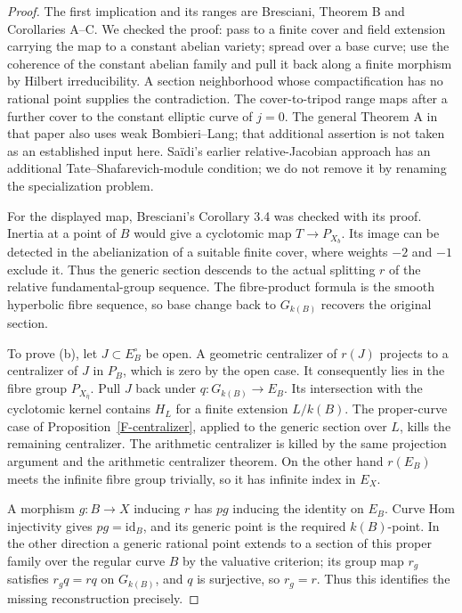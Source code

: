 \documentclass[11pt,oneside]{article}
\begin{document}
\begin{proof}
The first implication and its ranges are Bresciani, Theorem B
and Corollaries A--C\cite{F-BrescianiFiniteType}. We checked
the proof: pass to a finite cover and field extension carrying
the map to a constant abelian variety; spread over a base
curve; use the coherence of the constant abelian family and
pull it back along a finite morphism by Hilbert irreducibility.
A section neighborhood whose compactification has no rational
point supplies the contradiction. The cover-to-tripod range
maps after a further cover to the constant elliptic curve of
$j=0$. The general Theorem A in that paper also uses weak
Bombieri--Lang; that additional assertion is not taken as an
established input here. Sa\"idi's earlier relative-Jacobian
approach has an additional Tate--Shafarevich-module condition;
we do not remove it by renaming the specialization problem.

For the displayed map, Bresciani's Corollary 3.4 was checked
with its proof. Inertia at a point of $B$ would give a
cyclotomic map $T\to P_{X_b}$. Its image can be detected in
the abelianization of a suitable finite cover, where weights
$-2$ and $-1$ exclude it. Thus the generic section descends
to the actual splitting $r$ of the relative fundamental-group
sequence. The fibre-product formula is the smooth hyperbolic
fibre sequence, so base change back to $G_{k(B)}$ recovers the
original section.

To prove (b), let $J\subset E_B^\circ$ be open. A geometric
centralizer of $r(J)$ projects to a centralizer of $J$ in
$P_B$, which is zero by the open case. It consequently lies
in the fibre group $P_{X_{\overline\eta}}$. Pull $J$ back
under $q:G_{k(B)}\to E_B$. Its intersection with the
cyclotomic kernel contains $H_L$ for a finite extension
$L/k(B)$. The proper-curve case of
Proposition~\ref{F-centralizer}, applied to the generic
section over $L$, kills the remaining centralizer. The
arithmetic centralizer is killed by the same projection
argument and the arithmetic centralizer theorem. On the
other hand $r(E_B)$ meets the infinite fibre group trivially,
so it has infinite index in $E_X$.

A morphism $g:B\to X$ inducing $r$ has $p g$ inducing the
identity on $E_B$. Curve Hom injectivity gives $p g=\mathrm{id}_B$,
and its generic point is the required $k(B)$-point. In the
other direction a generic rational point extends to a section
of this proper family over the regular curve $B$ by the
valuative criterion; its group map $r_g$ satisfies $r_gq=rq$ on $G_{k(B)}$,
and $q$ is surjective, so $r_g=r$. Thus this identifies
the missing reconstruction precisely.


\end{proof}
\end{document}
